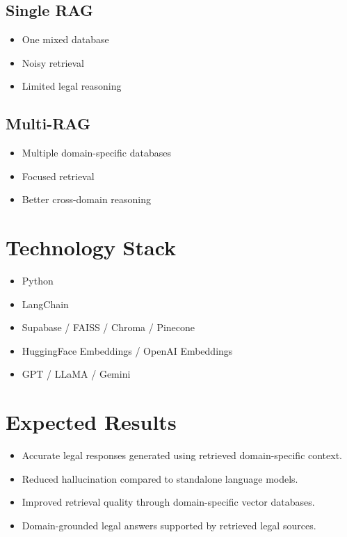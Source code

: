 \documentclass[12pt,a4paper]{article}
\begin{document}
\subsection*{Single RAG}

\begin{itemize}
\item One mixed database
\item Noisy retrieval
\item Limited legal reasoning
\end{itemize}

\subsection*{Multi-RAG}

\begin{itemize}
\item Multiple domain-specific databases
\item Focused retrieval
\item Better cross-domain reasoning
\end{itemize}

\section{Technology Stack}

\begin{itemize}
\item Python
\item LangChain
\item Supabase / FAISS / Chroma / Pinecone
\item HuggingFace Embeddings / OpenAI Embeddings
\item GPT / LLaMA / Gemini
\end{itemize}

\section{Expected Results}

\begin{itemize}
\item Accurate legal responses generated using retrieved domain-specific context.
\item Reduced hallucination compared to standalone language models.
\item Improved retrieval quality through domain-specific vector databases.
\item Domain-grounded legal answers supported by retrieved legal sources.
\end{itemize}
\end{document}
